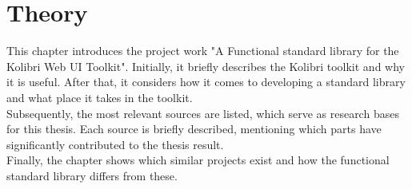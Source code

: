 \chapter{Theory}
This chapter introduces the project work "A Functional standard library for the
Kolibri Web UI Toolkit". Initially, it briefly describes the Kolibri toolkit
and why it is useful. After that, it considers how it comes to developing a
standard library and what place it takes in the toolkit. \\ 
Subsequently, the most relevant sources are listed, which serve as research
bases for this thesis. Each source is briefly described, mentioning which parts
have significantly contributed to the thesis result. \\ 
Finally, the chapter shows which similar projects exist and how the functional
standard library differs from these.



